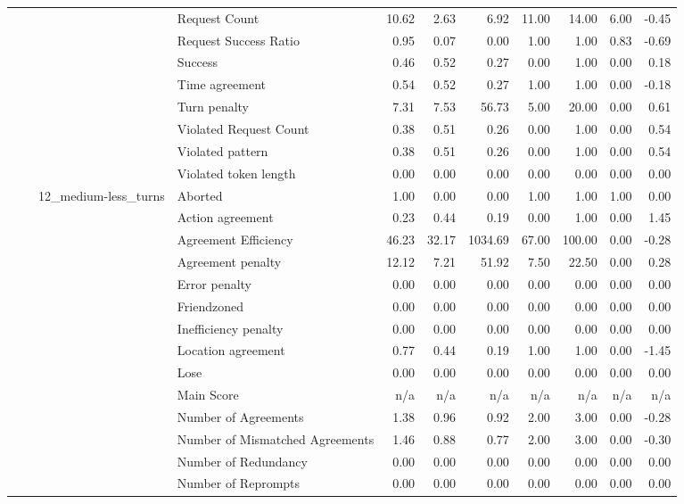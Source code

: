 \begin{tabular}{llllrrrrrrr}
 &  &  & Request Count & 10.62 & 2.63 & 6.92 & 11.00 & 14.00 & 6.00 & -0.45 \\
 &  &  & Request Success Ratio & 0.95 & 0.07 & 0.00 & 1.00 & 1.00 & 0.83 & -0.69 \\
 &  &  & Success & 0.46 & 0.52 & 0.27 & 0.00 & 1.00 & 0.00 & 0.18 \\
 &  &  & Time agreement & 0.54 & 0.52 & 0.27 & 1.00 & 1.00 & 0.00 & -0.18 \\
 &  &  & Turn penalty & 7.31 & 7.53 & 56.73 & 5.00 & 20.00 & 0.00 & 0.61 \\
 &  &  & Violated Request Count & 0.38 & 0.51 & 0.26 & 0.00 & 1.00 & 0.00 & 0.54 \\
 &  &  & Violated pattern & 0.38 & 0.51 & 0.26 & 0.00 & 1.00 & 0.00 & 0.54 \\
 &  &  & Violated token length & 0.00 & 0.00 & 0.00 & 0.00 & 0.00 & 0.00 & 0.00 \\
\cline{3-11}
 &  & \multirow[t]{27}{*}{12_medium-less_turns} & Aborted & 1.00 & 0.00 & 0.00 & 1.00 & 1.00 & 1.00 & 0.00 \\
 &  &  & Action agreement & 0.23 & 0.44 & 0.19 & 0.00 & 1.00 & 0.00 & 1.45 \\
 &  &  & Agreement Efficiency & 46.23 & 32.17 & 1034.69 & 67.00 & 100.00 & 0.00 & -0.28 \\
 &  &  & Agreement penalty & 12.12 & 7.21 & 51.92 & 7.50 & 22.50 & 0.00 & 0.28 \\
 &  &  & Error penalty & 0.00 & 0.00 & 0.00 & 0.00 & 0.00 & 0.00 & 0.00 \\
 &  &  & Friendzoned & 0.00 & 0.00 & 0.00 & 0.00 & 0.00 & 0.00 & 0.00 \\
 &  &  & Inefficiency penalty & 0.00 & 0.00 & 0.00 & 0.00 & 0.00 & 0.00 & 0.00 \\
 &  &  & Location agreement & 0.77 & 0.44 & 0.19 & 1.00 & 1.00 & 0.00 & -1.45 \\
 &  &  & Lose & 0.00 & 0.00 & 0.00 & 0.00 & 0.00 & 0.00 & 0.00 \\
 &  &  & Main Score & n/a & n/a & n/a & n/a & n/a & n/a & n/a \\
 &  &  & Number of Agreements & 1.38 & 0.96 & 0.92 & 2.00 & 3.00 & 0.00 & -0.28 \\
 &  &  & Number of Mismatched Agreements & 1.46 & 0.88 & 0.77 & 2.00 & 3.00 & 0.00 & -0.30 \\
 &  &  & Number of Redundancy & 0.00 & 0.00 & 0.00 & 0.00 & 0.00 & 0.00 & 0.00 \\
 &  &  & Number of Reprompts & 0.00 & 0.00 & 0.00 & 0.00 & 0.00 & 0.00 & 0.00 \\

\end{tabular}
